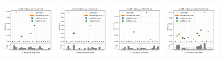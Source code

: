 \begin{figure}
    \centering
    \includegraphics[width=0.24\textwidth]{chapters/Appendix/sectionTTSyst/figures/afterCorr/icata0_ch0_isr.png}
    \includegraphics[width=0.24\textwidth]{chapters/Appendix/sectionTTSyst/figures/afterCorr/icata0_ch1_isr.png}
    \includegraphics[width=0.24\textwidth]{chapters/Appendix/sectionTTSyst/figures/afterCorr/icata0_ch2_isr.png}
    \includegraphics[width=0.24\textwidth]{chapters/Appendix/sectionTTSyst/figures/afterCorr/icata0_ch3_isr.png}


\end{figure}
